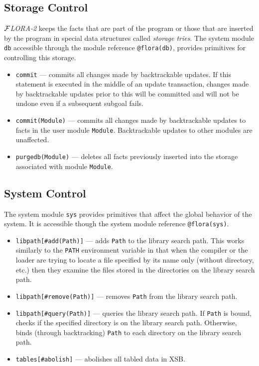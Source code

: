 \documentclass[11pt]{article}
\newcommand{\FLORA}{{\mbox{${\cal F}${\small\it LORA}\rm\emph{-2}}}\xspace}
\begin{document}
\subsection{Storage Control}\label{sec:storage-ctl}

\FLORA keeps the facts that are part of the program or those that are
inserted by the program in special data structures called \emph{storage
  tries}.  The system module {\tt db} accessible through the module
reference {\tt @flora(db)}, provides primitives for controlling this
storage.
\begin{itemize}
  \item  {\tt commit} --- commits all changes made by backtrackable updates.
    If this statement is executed in the middle of an update transaction,
    changes made by backtrackable updates prior to this will be committed
    and will not be undone even if a subsequent subgoal fails.
  \item {\tt commit(Module)} --- commits all changes made by backtrackable
    updates to facts in the user module {\tt Module}. Backtrackable updates
    to other modules are unaffected.
  \item {\tt purgedb(Module)} --- deletes all facts previously inserted
    into the storage associated with module {\tt Module}.
\end{itemize}

\subsection{System Control}

The system module {\tt sys} provides primitives that affect the global
behavior of the system. It is accessible though the system module reference
{\tt @flora(sys)}.
\begin{itemize}
  \item  {\tt libpath[\#add(Path)]} --- adds {\tt Path} to the library
    search path. This works similarly to the {\tt PATH} environment
    variable in that when the compiler or the loader are trying to locate a
    file specified by its name only (without directory, etc.) then they
    examine the files stored in the directories on the library search path.
  \item {\tt libpath[\#remove(Path)]} --- removes {\tt Path} from the
    library search path.
  \item {\tt libpath[\#query(Path)]} --- queries the library search path. If
    {\tt Path} is bound, checks if the specified directory is on the
    library search path. Otherwise, binds (through backtracking) {\tt Path}
    to each directory on the library search path.
  \item {\tt tables[\#abolish]} --- abolishes all tabled data in XSB.
\end{itemize}
\end{document}
